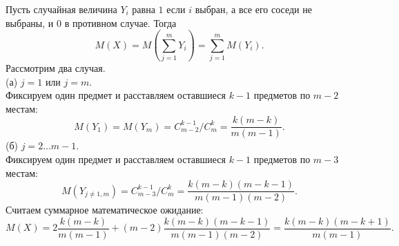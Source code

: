 \documentclass{article}
\begin{document}
Пусть случайная величина $Y_i$ равна $1$ если $i$ выбран, а все его соседи не выбраны, и $0$ в противном случае. Тогда
$$M(X) = M \left( \sum\limits_{j=1}^m Y_i \right) = \sum\limits_{j=1}^m M(Y_i).$$
Рассмотрим два случая.\\
(а) $j = 1$ или $j=m$.\\
Фиксируем один предмет и расставляем оставшиеся $k-1$ предметов по $m-2$ местам:
$$M(Y_1) = M(Y_m) = C_{m-2}^{k-1} / C_m^k = \frac{k(m-k)}{m(m-1)}.$$
(б) $j=2\ldots m-1$.\\
Фиксируем один предмет и расставляем оставшиеся $k-1$ предметов по $m-3$ местам:
$$M(Y_{j\neq 1,m}) = C_{m-3}^{k-1} / C_m^k = \frac{k(m-k)(m-k-1)}{m(m-1)(m-2)}.$$
Считаем суммарное математическое ожидание:
$$M(X) = 2 \frac{k(m-k)}{m(m-1)} + (m-2) \frac{k(m-k)(m-k-1)}{m(m-1)(m-2)} = \frac{k(m-k)(m-k+1)}{m(m-1)}.$$
\end{document}
